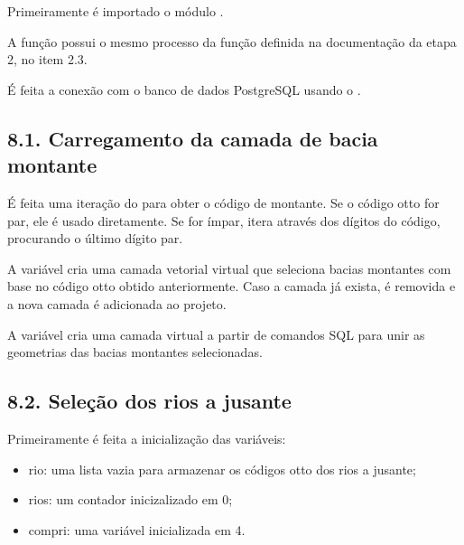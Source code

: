 \documentclass[a4paper,10pt,brazil]{sphinxmanual}
\begin{document}

\sphinxAtStartPar
Primeiramente é importado o módulo .

\sphinxAtStartPar
A função  possui o mesmo processo da função definida na documentação da etapa 2, no item 2.3.

\sphinxAtStartPar
É feita a conexão com o banco de dados PostgreSQL usando o .


\subsection{8.1. Carregamento da camada de bacia montante}
\label{\detokenize{8representacaoSelecao:carregamento-da-camada-de-bacia-montante}}
\sphinxAtStartPar
É feita uma iteração do  para obter o código de montante. Se o código otto for par, ele é usado diretamente. Se for ímpar, itera através dos dígitos do código, procurando o último dígito par.

\sphinxAtStartPar
A variável  cria uma camada vetorial virtual que seleciona bacias montantes com base no código otto obtido anteriormente. Caso a camada já exista, é removida e a nova camada é adicionada ao projeto.

\sphinxAtStartPar
A variável  cria uma camada virtual a partir de comandos SQL para unir as geometrias das bacias montantes selecionadas.


\subsection{8.2. Seleção dos rios a jusante}
\label{\detokenize{8representacaoSelecao:selecao-dos-rios-a-jusante}}
\sphinxAtStartPar
Primeiramente é feita a inicialização das variáveis:
\begin{itemize}
\item {} 
\sphinxAtStartPar
rio: uma lista vazia para armazenar os códigos otto dos rios a jusante;

\item {} 
\sphinxAtStartPar
rios: um contador inicizalizado em 0;

\item {} 
\sphinxAtStartPar
compri: uma variável inicializada em 4.

\end{itemize}
\end{document}
